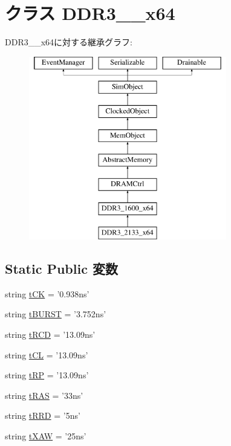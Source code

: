\hypertarget{classDRAMCtrl_1_1DDR3__2133__x64}{
\section{クラス DDR3\_\_\-x64}
\label{classDRAMCtrl_1_1DDR3__2133__x64}
}
DDR3\_\_\-x64に対する継承グラフ:\begin{figure}[H]
\begin{center}
\leavevmode
\includegraphics[height=8cm]{classDRAMCtrl_1_1DDR3__2133__x64}
\end{center}
\end{figure}
\subsection*{Static Public 変数}
\begin{DoxyCompactItemize}
\item 
string \hyperlink{classDRAMCtrl_1_1DDR3__2133__x64_a78016df5bd6c91551bcf487d3d665ebe}{tCK} = '0.938ns'
\item 
string \hyperlink{classDRAMCtrl_1_1DDR3__2133__x64_af962cc8ff13de9c28027368562b67c1e}{tBURST} = '3.752ns'
\item 
string \hyperlink{classDRAMCtrl_1_1DDR3__2133__x64_a31691ebf1f58ff89b00f261f5adea8e2}{tRCD} = '13.09ns'
\item 
string \hyperlink{classDRAMCtrl_1_1DDR3__2133__x64_a009c2614e5d317cb4805a4a98ace1b19}{tCL} = '13.09ns'
\item 
string \hyperlink{classDRAMCtrl_1_1DDR3__2133__x64_aeda425967c3cf2880bdc1640e9733439}{tRP} = '13.09ns'
\item 
string \hyperlink{classDRAMCtrl_1_1DDR3__2133__x64_a1b5f15dad9d492ce5d0167e1581de8cc}{tRAS} = '33ns'
\item 
string \hyperlink{classDRAMCtrl_1_1DDR3__2133__x64_ad1724b7d6484bbc6051f43d4ae9e16d2}{tRRD} = '5ns'
\item 
string \hyperlink{classDRAMCtrl_1_1DDR3__2133__x64_a94c112e585153e09e803751da3cfafcd}{tXAW} = '25ns'
\end{DoxyCompactItemize}


